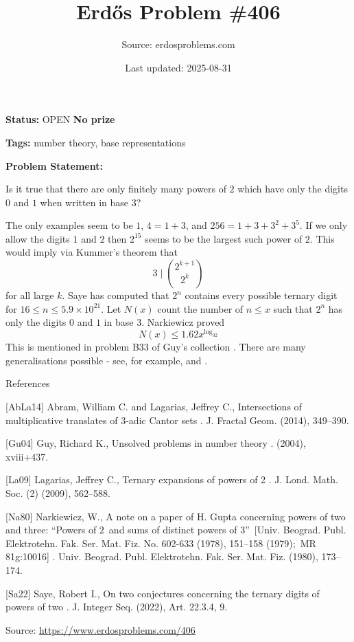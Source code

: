 \documentclass{article}
\title{Erd\H{o}s Problem \#406}
\date{Last updated: 2025-08-31}
\author{Source: erdosproblems.com}
\begin{document}
\maketitle

\noindent\textbf{Status:} OPEN \quad \textbf{No prize}

\noindent\textbf{Tags:} number theory, base representations

\medskip

\noindent\textbf{Problem Statement:}

Is it true that there are only finitely many powers of $2$ which have only the digits $0$ and $1$ when written in base $3$?




The only examples seem to be $1$, $4=1+3$, and $256=1+3+3^2+3^5$. If we only allow the digits $1$ and $2$ then $2^{15}$ seems to be the largest such power of $2$. This would imply via Kummer's theorem that\[3\mid \binom{2^{k+1}}{2^k}\]for all large $k$. Saye \cite{Sa22} has computed that $2^n$ contains every possible ternary digit for $16\leq n \leq 5.9\times 10^{21}$. Let $N(x)$ count the number of $n\leq x$ such that $2^n$ has only the digits $0$ and $1$ in base $3$. Narkiewicz \cite{Na80} proved\[N(x)\leq 1.62 x^{\log_32}\]This is mentioned in problem B33 of Guy's collection \cite{Gu04}. There are many generalisations possible - see, for example, \cite{AbLa14} and \cite{La09}.




References

[AbLa14] Abram, William C. and Lagarias, Jeffrey C., Intersections of multiplicative translates of 3-adic {C}antor sets . J. Fractal Geom. (2014), 349--390.

[Gu04] Guy, Richard K., Unsolved problems in number theory . (2004), xviii+437.

[La09] Lagarias, Jeffrey C., Ternary expansions of powers of 2 . J. Lond. Math. Soc. (2) (2009), 562--588.

[Na80] Narkiewicz, W., A note on a paper of {H}. {G}upta concerning powers of two and three: ``{P}owers of {$2$}\ and sums of distinct powers of {$3$}''\ [{U}niv. {B}eograd. {P}ubl. {E}lektrotehn. {F}ak. Ser. {M}at. {F}iz. {N}o. 602-633 (1978), 151--158 (1979);\ {MR} 81g:10016] . Univ. Beograd. Publ. Elektrotehn. Fak. Ser. Mat. Fiz. (1980), 173--174.

[Sa22] Saye, Robert I., On two conjectures concerning the ternary digits of powers of two . J. Integer Seq. (2022), Art. 22.3.4, 9.


\bigskip
\noindent\small{Source: \url{https://www.erdosproblems.com/406}}
\end{document}
